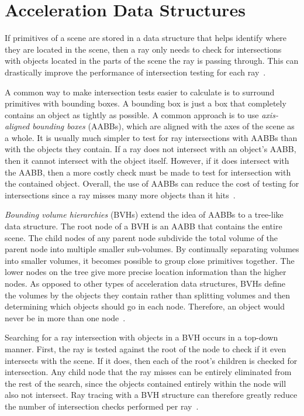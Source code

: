 \documentclass{sig-alternate}
\begin{document}

\section{Acceleration Data Structures}
\label{sec:body}

If primitives of a scene are stored in a data structure that helps identify where they are located in the scene, then a ray only needs to check for intersections with objects located in the parts of the scene the ray is passing through. This can drastically improve the performance of intersection testing for each ray~\cite{wiki:rayTracing}.

A common way to make intersection tests easier to calculate is to surround primitives with bounding boxes. A bounding box is just a box that completely contains an object as tightly as possible. A common approach is to use \emph{axis-aligned bounding boxes} (AABBs), which are aligned with the axes of the scene as a whole. It is usually much simpler to test for ray intersections with AABBs than with the objects they contain. If a ray does not intersect with an object's AABB, then it cannot intersect with the object itself. However, if it does intersect with the AABB, then a more costly check must be made to test for intersection with the contained object. Overall, the use of AABBs can reduce the cost of testing for intersections since a ray misses many more objects than it hits~\cite{wiki:box}.

\emph{Bounding volume hierarchies} (BVHs) extend the idea of AABBs to a tree-like data structure. The root node of a BVH is an AABB that contains the entire scene. The child nodes of any parent node subdivide the total volume of the parent node into multiple smaller sub-volumes. By continually separating volumes into smaller volumes, it becomes possible to group close primitives together. The lower nodes on the tree give more precise location information than the higher nodes. As opposed to other types of acceleration data structures, BVHs define the volumes by the objects they contain rather than splitting volumes and then determining which objects should go in each node. Therefore, an object would never be in more than one node~\cite{wiki:bvh}.

Searching for a ray intersection with objects in a BVH occurs in a top-down manner. First, the ray is tested against the root of the node to check if it even intersects with the scene. If it does, then each of the root's children is checked for intersection. Any child node that the ray misses can be entirely eliminated from the rest of the search, since the objects contained entirely within the node will also not intersect. Ray tracing with a BVH structure can therefore greatly reduce the number of intersection checks performed per ray~\cite{wiki:bvh}.
\end{document}
